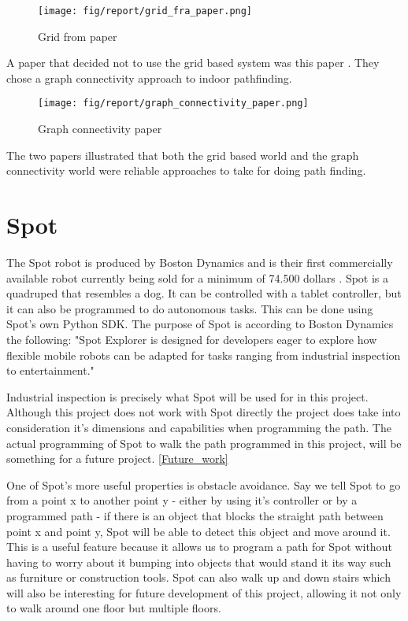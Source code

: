 \begin{figure}[H]
    \centering
    \texttt{[image: fig/report/grid\_fra\_paper.png]}
    \label{}
    \caption[]{Grid from paper}
\end{figure}
A paper that decided not to use the grid based system was this paper \cite{lee2010computing}. They chose a graph connectivity approach to indoor pathfinding.
\begin{figure}[H]
    \centering
    \texttt{[image: fig/report/graph\_connectivity\_paper.png]}
    \label{}
    \caption[]{Graph connectivity paper}
\end{figure}
The two papers illustrated that both the grid based world and the graph connectivity world were reliable approaches to take for doing path finding.

\section{Spot}
The Spot robot is produced by Boston Dynamics and is their first commercially available robot currently being sold for a minimum of 74.500 dollars \cite{spot}. Spot is a quadruped that resembles a dog. It can be controlled with a tablet controller, but it can also be programmed to do autonomous tasks. This can be done using Spot's own Python SDK. The purpose of Spot is according to Boston Dynamics the following: "Spot Explorer is designed for developers eager to explore how flexible mobile robots can be adapted for tasks ranging from industrial inspection to entertainment."\cite{spot}

Industrial inspection is precisely what Spot will be used for in this project. Although this project does not work with Spot directly the project does take into consideration it's dimensions and capabilities when programming the path. The actual programming of Spot to walk the path programmed in this project, will be something for a future project. \ref{Future_work}

One of Spot's more useful properties is obstacle avoidance. Say we tell Spot to go from a point x to another point y - either by using it's controller or by a programmed path - if there is an object that blocks the straight path between point x and point y, Spot will be able to detect this object and move around it. 
This is a useful feature because it allows us to program a path for Spot without having to worry about it bumping into objects that would stand it its way such as furniture or construction tools.
Spot can also walk up and down stairs which will also be interesting for future development of this project, allowing it not only to walk around one floor but multiple floors.

